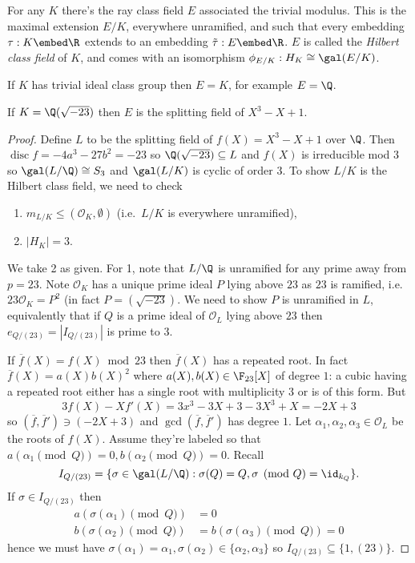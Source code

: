 \documentclass[a4paper]{article}
\renewcommand*{\O}{\mathcal{O}}
\begin{document}
\begin{eg}
  For any \(K\) there's the ray class field \(E\) associated the trivial modulus. This is the maximal extension \(E/K\), everywhere unramified, and such that every embedding \(\tau: K \embed \R\) extends to an embedding \(\tilde \tau: E \embed \R\). \(E\) is called the \emph{Hilbert class field} of \(K\), and comes with an isomorphism \(\phi_{E/K}: H_K \cong \gal(E/K)\).

  If \(K\) has trivial ideal class group then \(E = K\), for example \(E = \Q\).

  If \(K = \Q(\sqrt{-23})\) then \(E\) is the splitting field of \(X^3 - X + 1\).

  \begin{proof}
    Define \(L\) to be the splitting field of \(f(X) = X^3 - X + 1\) over \(\Q\). Then \(\operatorname{disc} f = -4a^3 - 27b^2 = -23\) so \(\Q(\sqrt{-23}) \subseteq L\) and \(f(X)\) is irreducible mod \(3\) so \(\gal(L/\Q) \cong S_3\) and \(\gal(L/K)\) is cyclic of order \(3\). To show \(L/K\) is the Hilbert class field, we need to check
    \begin{enumerate}
    \item \(m_{L/K} \leq (\O_K, \emptyset)\) (i.e.\ \(L/K\) is everywhere unramified),
      \item \(|H_K| = 3\).
      \end{enumerate}
      We take 2 as given. For 1, note that \(L/\Q\) is unramified for any prime away from \(p = 23\). Note \(\O_K\) has a unique prime ideal \(P\) lying above \(23\) as \(23\) is ramified, i.e.\ \(23\O_K = P^2\) (in fact \(P = (\sqrt{-23})\). We need to show \(P\) is unramified in \(L\), equivalently that if \(Q\) is a prime ideal of \(\O_L\) lying above \(23\) then \(e_{Q/(23)} = |I_{Q/(23)}|\) is prime to \(3\).

      If \(\overline f(X) = f(X) \bmod{23}\) then \(\overline f(X)\) has a repeated root. In fact \(\overline f(X) = a(X) b(X)^2\) where \(a(X), b(X) \in \F_{23}[X]\) of degree \(1\): a cubic having a repeated root either has a single root with multiplicity \(3\) or is of this form. But
      \[
        3f(X) - Xf'(X) = 3x^3 - 3X + 3 - 3X^3 + X = -2X + 3
      \]
      so \((\overline f, \overline f') \ni (-2X + 3)\) and \(\gcd(\overline f, \overline f')\) has degree \(1\). Let \(\alpha_1, \alpha_2, \alpha_3 \in \O_L\) be the roots of \(f(X)\). Assume they're labeled so that \(a(\alpha_1 \pmod Q) = 0, b(\alpha_2 \pmod Q) = 0\). Recall
      \[
        I_{Q/(23)} = \{\sigma \in \gal(L/\Q): \sigma(Q) = Q, \sigma \pmod Q = \id_{k_Q}\}.
      \]
      If \(\sigma \in I_{Q/(23)}\) then
      \begin{align*}
        a(\sigma(\alpha_1) \pmod Q) &= 0 \\
        b(\sigma(\alpha_2) \pmod Q) &= b(\sigma(\alpha_3) \pmod Q) = 0
      \end{align*}
      hence we must have \(\sigma(\alpha_1) = \alpha_1, \sigma(\alpha_2) \in \{\alpha_2, \alpha_3\}\) so \(I_{Q/(23)} \subseteq \{1, (23)\}\).
  \end{proof}
\end{eg}
\end{document}
